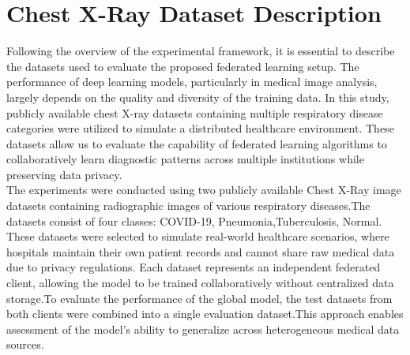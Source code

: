 \documentclass[12pt]{book}
\begin{document}
\section{Chest X-Ray Dataset Description}

Following the overview of the experimental framework, it is essential to describe the datasets used to evaluate the proposed federated learning setup. The performance of deep learning models, particularly in medical image analysis, largely depends on the quality and diversity of the training data. In this study, publicly available chest X-ray datasets containing multiple respiratory disease categories were utilized to simulate a distributed healthcare environment. These datasets allow us to evaluate the capability of federated learning algorithms to collaboratively learn diagnostic patterns across multiple institutions while preserving data privacy.\\

The experiments were conducted using two publicly available Chest X-Ray image datasets containing radiographic images of various respiratory diseases.The datasets consist of four classes: COVID-19, Pneumonia,Tuberculosis, Normal.\\

These datasets were selected to simulate real-world healthcare scenarios, where hospitals maintain their own patient records and cannot share raw medical data due to privacy regulations. Each dataset represents an independent federated client, allowing the model to be trained collaboratively without centralized data storage.To evaluate the performance of the global model, the test datasets from both clients were combined into a single evaluation dataset.This approach enables assessment of the model's ability to generalize across heterogeneous medical data sources.
\end{document}
